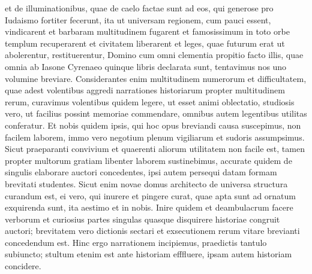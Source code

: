 \begin{biblechapter}
\begin{biblechapter}
\verse et de illuminationibus, quae de caelo factae sunt ad eos, qui generose pro Iudaismo fortiter fecerunt, ita ut universam regionem, cum pauci essent, vindicarent et barbaram multitudinem fugarent 
\verse et famosissimum in toto orbe templum recuperarent et civitatem liberarent et leges, quae futurum erat ut abolerentur, restituerentur, Domino cum omni clementia propitio facto illis, 
\verse quae omnia ab Iasone Cyrenaeo quinque libris declarata sunt, tentavimus nos uno volumine breviare. 
\verse Considerantes enim multitudinem numerorum et difficultatem, quae adest volentibus aggredi narrationes historiarum propter multitudinem rerum, 
\verse curavimus volentibus quidem legere, ut esset animi oblectatio, studiosis vero, ut facilius possint memoriae commendare, omnibus autem legentibus utilitas conferatur. 
\verse Et nobis quidem ipsis, qui hoc opus breviandi causa suscepimus, non facilem laborem, immo vero negotium plenum vigiliarum et sudoris assumpsimus. 
\verse Sicut praeparanti convivium et quaerenti aliorum utilitatem non facile est, tamen propter multorum gratiam libenter laborem sustinebimus, 
 \verse accurate quidem de singulis elaborare auctori concedentes, ipsi autem persequi datam formam brevitati studentes. 
\verse Sicut enim novae domus architecto de universa structura curandum est, ei vero, qui inurere et pingere curat, quae apta sunt ad ornatum exquirenda sunt, ita aestimo et in nobis. 
 \verse Inire quidem et deambulacrum facere verborum et curiosius partes singulas quasque disquirere historiae congruit auctori; 
\verse brevitatem vero dictionis sectari et exsecutionem rerum vitare brevianti concedendum est. 
\verse Hinc ergo narrationem incipiemus, praedictis tantulo subiuncto; stultum etenim est ante historiam efffluere, ipsam autem historiam concidere.
 

\end{biblechapter}
\end{biblechapter}
